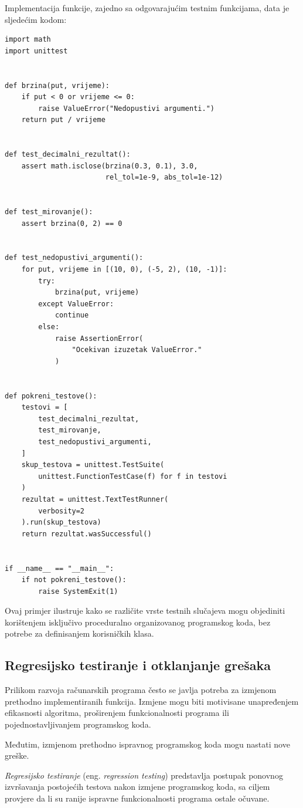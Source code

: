 Implementacija funkcije, zajedno sa odgovarajućim 
testnim funkcijama, data je sljedećim kodom:

\begin{verbatim}
import math
import unittest


def brzina(put, vrijeme):
    if put < 0 or vrijeme <= 0:
        raise ValueError("Nedopustivi argumenti.")
    return put / vrijeme


def test_decimalni_rezultat():
    assert math.isclose(brzina(0.3, 0.1), 3.0,
                        rel_tol=1e-9, abs_tol=1e-12)


def test_mirovanje():
    assert brzina(0, 2) == 0


def test_nedopustivi_argumenti():
    for put, vrijeme in [(10, 0), (-5, 2), (10, -1)]:
        try:
            brzina(put, vrijeme)
        except ValueError:
            continue
        else:
            raise AssertionError(
                "Ocekivan izuzetak ValueError."
            )


def pokreni_testove():
    testovi = [
        test_decimalni_rezultat,
        test_mirovanje,
        test_nedopustivi_argumenti,
    ]
    skup_testova = unittest.TestSuite(
        unittest.FunctionTestCase(f) for f in testovi
    )
    rezultat = unittest.TextTestRunner(
        verbosity=2
    ).run(skup_testova)
    return rezultat.wasSuccessful()


if __name__ == "__main__":
    if not pokreni_testove():
        raise SystemExit(1)
\end{verbatim}

Ovaj primjer ilustruje kako se različite vrste 
testnih slučajeva mogu objediniti korištenjem 
isključivo proceduralno organizovanog programskog 
koda, bez potrebe za definisanjem korisničkih klasa.


\subsection{Regresijsko testiranje i otklanjanje grešaka}

Prilikom razvoja računarskih programa često se 
javlja potreba za izmjenom prethodno implementiranih 
funkcija. Izmjene mogu biti motivisane unapređenjem 
efikasnosti algoritma, proširenjem funkcionalnosti 
programa ili pojednostavljivanjem programskog koda.

Međutim, izmjenom prethodno ispravnog programskog 
koda mogu nastati nove greške.

\textit{Regresijsko testiranje} (eng. \emph{regression 
	testing}) predstavlja postupak ponovnog izvršavanja 
postojećih testova nakon izmjene programskog koda, 
sa ciljem provjere da li su ranije ispravne 
funkcionalnosti programa ostale očuvane.

